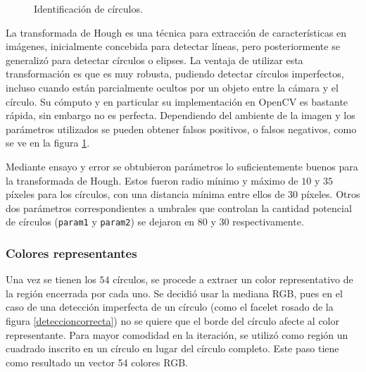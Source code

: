 \begin{figure}[h!]
	\centering
	\caption{Identificación de círculos.}
	\label{circulos}
\end{figure}

La transformada de Hough\cite{hough} es una técnica para extracción de características en imágenes, inicialmente concebida para detectar líneas, pero posteriormente se generalizó para detectar círculos o elipses. La ventaja de utilizar esta transformación es que es muy robusta, pudiendo detectar círculos imperfectos, incluso cuando están parcialmente ocultos por un objeto entre la cámara y el círculo. Su cómputo y en particular su implementación en OpenCV es bastante rápida, sin embargo no es perfecta. Dependiendo del ambiente de la imagen y los parámetros utilizados se pueden obtener falsos positivos, o falsos negativos, como se ve en la figura \ref{circulos}.

Mediante ensayo y error se obtubieron parámetros lo suficientemente buenos para la transformada de Hough. Estos fueron radio mínimo y máximo de $10$ y $35$ píxeles para los círculos, con una distancia mínima entre ellos de $30$ píxeles. Otros dos parámetros correspondientes a umbrales que controlan la cantidad potencial de círculos (\texttt{param1} y \texttt{param2}) se dejaron en $80$ y $30$ respectivamente.

\subsubsection{Colores representantes}
Una vez se tienen los $54$ círculos, se procede a extraer un color representativo de la región encerrada por cada uno. Se decidió usar la mediana RGB, pues en el caso de una detección imperfecta de un círculo (como el facelet rosado de la figura \ref{deteccioncorrecta}) no se quiere que el borde del círculo afecte al color representante. Para mayor comodidad en la iteración, se utilizó como región un cuadrado inscrito en un círculo en lugar del círculo completo. Este paso tiene como resultado un vector 54 colores RGB.

